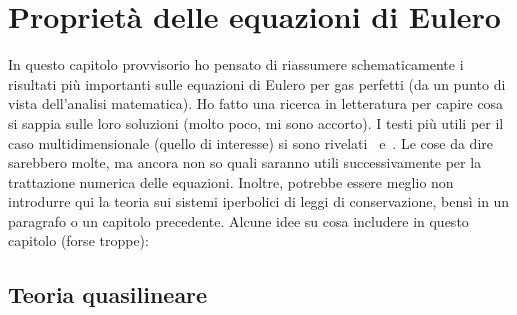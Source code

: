 
\section{Proprietà delle equazioni di Eulero}

In questo capitolo provvisorio ho pensato di riassumere schematicamente
i risultati più importanti sulle equazioni di Eulero per gas perfetti
(da un punto di vista dell'analisi matematica).
Ho fatto una ricerca in letteratura per capire cosa si sappia
sulle loro soluzioni (molto poco, mi sono accorto).
I testi più utili per il caso multidimensionale (quello di interesse)
si sono rivelati~\cite{serre} e~\cite{benzoni-gavage-serre}.
Le cose da dire sarebbero molte, ma ancora non so quali saranno
utili successivamente per la trattazione numerica delle equazioni.
Inoltre, potrebbe essere meglio non introdurre qui
la teoria sui sistemi iperbolici di leggi di conservazione,
bensì in un paragrafo o un capitolo precedente.
Alcune idee su cosa includere in questo capitolo (forse troppe):

\subsection*{Teoria quasilineare}

